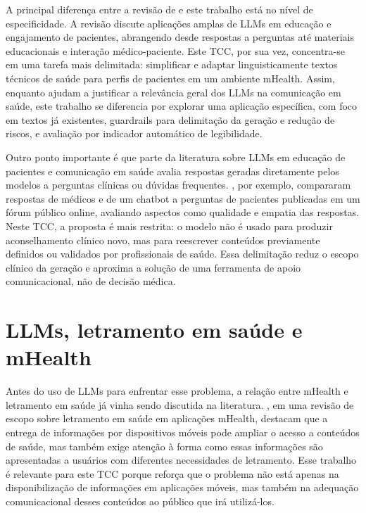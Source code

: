 A principal diferença entre a revisão de  e este trabalho está no nível de especificidade. A revisão discute aplicações amplas de LLMs em educação e engajamento de pacientes, abrangendo desde respostas a perguntas até materiais educacionais e interação médico-paciente. Este TCC, por sua vez, concentra-se em uma tarefa mais delimitada: simplificar e adaptar linguisticamente textos técnicos de saúde para perfis de pacientes em um ambiente mHealth. Assim, enquanto  ajudam a justificar a relevância geral dos LLMs na comunicação em saúde, este trabalho se diferencia por explorar uma aplicação específica, com foco em textos já existentes, guardrails para delimitação da geração e redução de riscos, e avaliação por indicador automático de legibilidade.

Outro ponto importante é que parte da literatura sobre LLMs em educação de pacientes e comunicação em saúde avalia respostas geradas diretamente pelos modelos a perguntas clínicas ou dúvidas frequentes. , por exemplo, compararam respostas de médicos e de um chatbot a perguntas de pacientes publicadas em um fórum público online, avaliando aspectos como qualidade e empatia das respostas. Neste TCC, a proposta é mais restrita: o modelo não é usado para produzir aconselhamento clínico novo, mas para reescrever conteúdos previamente definidos ou validados por profissionais de saúde. Essa delimitação reduz o escopo clínico da geração e aproxima a solução de uma ferramenta de apoio comunicacional, não de decisão médica.

\section{LLMs, letramento em saúde e mHealth}
\label{sec:llms-letramento-saude-mhealth}

Antes do uso de LLMs para enfrentar esse problema, a relação entre mHealth e letramento em saúde já vinha sendo discutida na literatura. , em uma revisão de escopo sobre letramento em saúde em aplicações mHealth, destacam que a entrega de informações por dispositivos móveis pode ampliar o acesso a conteúdos de saúde, mas também exige atenção à forma como essas informações são apresentadas a usuários com diferentes necessidades de letramento. Esse trabalho é relevante para este TCC porque reforça que o problema não está apenas na disponibilização de informações em aplicações móveis, mas também na adequação comunicacional desses conteúdos ao público que irá utilizá-los.

